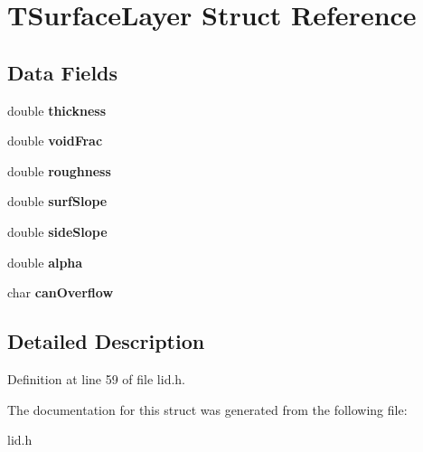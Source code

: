 \hypertarget{struct_t_surface_layer}{}\section{T\+Surface\+Layer Struct Reference}
\label{struct_t_surface_layer}
\subsection*{Data Fields}
\begin{DoxyCompactItemize}
\item 
\mbox{\label{struct_t_surface_layer_a20238819f2c84ce6d3f083ded9ac612d}} 
double {\bfseries thickness}
\item 
\mbox{\label{struct_t_surface_layer_a7d25974d9e4546293ba18fee0f29620f}} 
double {\bfseries void\+Frac}
\item 
\mbox{\label{struct_t_surface_layer_aae6a29bf1aea8336238154d7b4b95994}} 
double {\bfseries roughness}
\item 
\mbox{\label{struct_t_surface_layer_a4c88072f85b4a8bb62e1187447866912}} 
double {\bfseries surf\+Slope}
\item 
\mbox{\label{struct_t_surface_layer_a45c1458b6e14cd542daf53777a3791d5}} 
double {\bfseries side\+Slope}
\item 
\mbox{\label{struct_t_surface_layer_a20f4c4490bc8ecbdd1ffcb79acce6035}} 
double {\bfseries alpha}
\item 
\mbox{\label{struct_t_surface_layer_aa802c8284c2ae7812886c76c83443022}} 
char {\bfseries can\+Overflow}
\end{DoxyCompactItemize}


\subsection{Detailed Description}


Definition at line 59 of file lid.\+h.



The documentation for this struct was generated from the following file\+:\begin{DoxyCompactItemize}
\item 
lid.\+h\end{DoxyCompactItemize}
